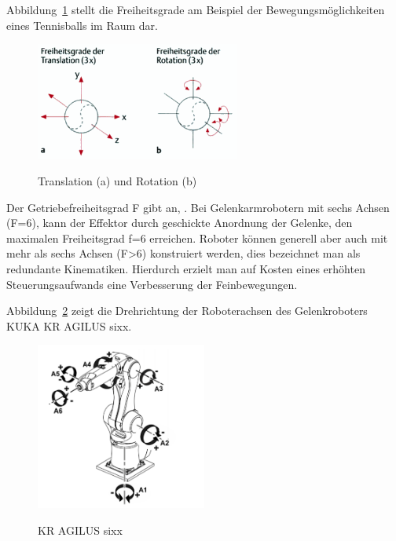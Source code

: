 \documentclass[11pt,ngerman,parskip=half]{scrartcl}
\begin{document}
Abbildung~\ref{img:john3} stellt die Freiheitsgrade am
Beispiel der Bewegungsmöglichkeiten eines Tennisballs im Raum dar.
\begin{figure}[H]
  \centering
  \includegraphics[width=0.6\textwidth]{src/img/john3.png}
  \caption{Translation (a) und Rotation (b)}
  \label{img:john3}
  \parencite[][53]{schunke_funktionelle_2014}
\end{figure}

Der Getriebefreiheitsgrad F gibt an,
. Bei Gelenkarmrobotern mit sechs Achsen (F=6), kann der
Effektor durch geschickte Anordnung der Gelenke, den maximalen Freiheitsgrad
f=6 erreichen. Roboter können generell aber auch mit mehr als sechs Achsen
(F>6) konstruiert werden, dies bezeichnet man als redundante Kinematiken.
Hierdurch erzielt man auf Kosten eines erhöhten Steuerungsaufwands eine
Verbesserung der Feinbewegungen.
\parencite[vgl.][18]{weber_industrieroboter:_2017}

Abbildung~\ref{img:john4} zeigt die Drehrichtung der Roboterachsen des
Gelenkroboters KUKA KR AGILUS sixx.
\begin{figure}[H]
  \centering
  \includegraphics[width=0.5\textwidth]{src/img/john4.png}
  \caption{KR AGILUS sixx}
  \label{img:john4}
  \parencite{kuka_gmbh_kr_2018}
\end{figure}
\end{document}
